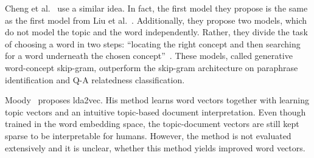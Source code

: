 \documentclass[
        a4paper,
        titlepage,
        twoside,
        parskip,
        numbers=noenddot
        ]{scrbook}
\theoremstyle{break}
\begin{document}
Cheng et al.~\cite{Cheng2015} use a similar idea.
In fact, the first model they propose is the same as the first model from Liu et al.~\cite{Liu2015}.
Additionally, they propose two models, which do not model the topic and the word independently.
Rather, they divide the task of choosing a word in two steps: ``locating the right concept and then searching for a word underneath the chosen concept''~\cite{Cheng2015}.
These models, called generative word-concept skip-gram, outperform the skip-gram architecture on paraphrase identification and Q-A relatedness classification.

Moody~\cite{Moody2016} proposes lda2vec.
His method learns word vectors together with learning topic vectors and an intuitive topic-based document interpretation.
Even though trained in the word embedding space, the topic-document vectors are still kept sparse to be interpretable for humans.
However, the method is not evaluated extensively and it is unclear, whether this method yields improved word vectors.




\end{document}
